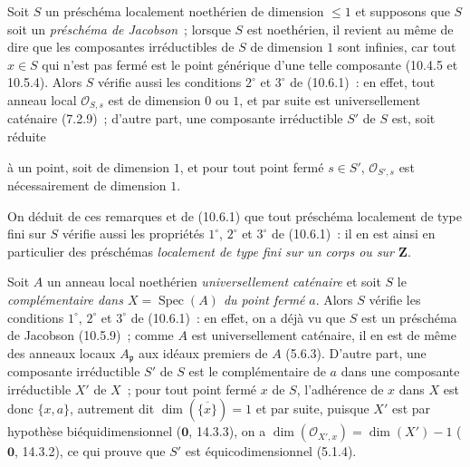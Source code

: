 \begin{env}[10.7.1]
\label{IV.10.7.1-fr}
Soit $S$ un préschéma localement noethérien de dimension $\leq1$ et supposons
que $S$ soit un \emph{préschéma de Jacobson}~; lorsque $S$ est noethérien, il
revient au même de dire que les composantes irréductibles de $S$ de dimension
$1$ sont infinies, car tout $x\in S$ qui n'est pas fermé est le point générique
d'une telle composante (10.4.5 et 10.5.4). Alors $S$ vérifie aussi les conditions
$2^\circ$ et $3^\circ$ de (10.6.1)~: en effet, tout anneau local $\mathcal O_{S,s}$
est de dimension $0$ ou $1$, et par suite est universellement caténaire (7.2.9)~;
d'autre part, une composante irréductible $S'$ de $S$ est, soit réduite

à un point, soit de dimension $1$, et pour tout point fermé $s\in S'$,
$\mathcal O_{S',s}$ est nécessairement de dimension $1$.

On déduit de ces remarques et de (10.6.1) que tout préschéma localement de type
fini sur $S$ vérifie aussi les propriétés $1^\circ$, $2^\circ$ et $3^\circ$ de
(10.6.1)~: il en est ainsi en particulier des préschémas \emph{localement de type
fini sur un corps ou sur $\mathbf Z$}.
\end{env}

\begin{env}[10.7.2]
\label{IV.10.7.2-fr}
Soit $A$ un anneau local noethérien \emph{universellement caténaire} et soit $S$
le \emph{complémentaire dans $X=\operatorname{Spec}(A)$ du point fermé} $a$.
Alors $S$ vérifie les conditions $1^\circ$, $2^\circ$ et $3^\circ$ de (10.6.1)~:
en effet, on a déjà vu que $S$ est un préschéma de Jacobson (10.5.9)~; comme $A$
est universellement caténaire, il en est de même des anneaux locaux $A_{\mathfrak p}$
aux idéaux premiers de $A$ (5.6.3). D'autre part, une composante irréductible $S'$
de $S$ est le complémentaire de $a$ dans une composante irréductible $X'$ de $X$~;
pour tout point fermé $x$ de $S$, l'adhérence de $x$ dans $X$ est donc
$\{x,a\}$, autrement dit $\dim(\overline{\{x\}})=1$ et par suite, puisque $X'$
est par hypothèse biéquidimensionnel ($\mathbf 0$, 14.3.3), on a
$\dim(\mathcal O_{X',x})=\dim(X')-1$ ($\mathbf 0$, 14.3.2), ce qui prouve que $S'$
est équicodimensionnel (5.1.4).
\end{env}

